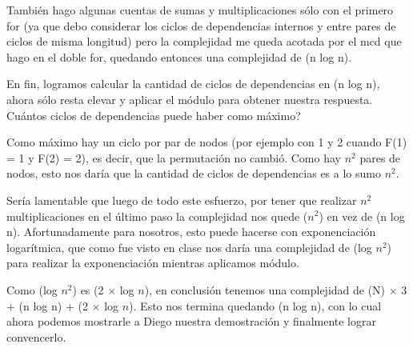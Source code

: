 	También hago algunas cuentas de sumas y multiplicaciones sólo con el primero for (ya que debo considerar los ciclos de dependencias internos y entre pares de ciclos de misma longitud) pero la complejidad me queda acotada por el mcd que hago en el doble for, quedando entonces una complejidad de \bigo(n log n). \newline

	En fin, logramos calcular la cantidad de ciclos de dependencias en \bigo(n log n), ahora sólo resta elevar y aplicar el módulo para obtener nuestra respuesta. Cuántos ciclos de dependencias puede haber como máximo? \newline

	Como máximo hay un ciclo por par de nodos (por ejemplo con 1 y 2 cuando F(1) = 1 y F(2) = 2), es decir, que la permutación no cambió. Como hay $n^2$ pares de nodos, esto nos daría que la cantidad de ciclos de dependencias es a lo sumo $n^2$. \newline

	Sería lamentable que luego de todo este esfuerzo, por tener que realizar $n^2$ multiplicaciones en el último paso la complejidad nos quede \bigo($n^2$) en vez de \bigo(n log n). Afortunadamente para nosotros, esto puede hacerse con exponenciación logarítmica, que como fue visto en clase nos daría una complejidad de \bigo(log $n^2$) para realizar la exponenciación mientras aplicamos módulo. \newline

	Como \bigo(log $n^2$) es \bigo(2 $\times$ log $n$), en conclusión tenemos una complejidad de \bigo(N) $\times$ 3 + \bigo(n log n) + \bigo(2 $\times$ log $n$). Esto nos termina quedando \bigo(n log n), con lo cual ahora podemos mostrarle a Diego nuestra demostración y finalmente lograr convencerlo.